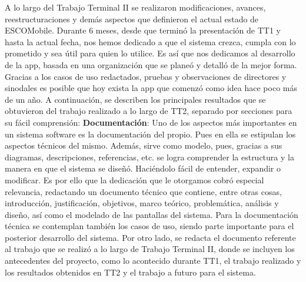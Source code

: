 \noindent
A lo largo del Trabajo Terminal II se realizaron modificaciones, avances, reestructuraciones y demás aspectos que definieron el actual estado de ESCOMobile. Durante 6 meses, desde que terminó la presentación de TT1 y hasta la actual fecha, nos hemos dedicado a que el sistema crezca, cumpla con lo prometido y sea útil para quien lo utilice. Es así que nos dedicamos al desarrollo de la app, basada en una organización que se planeó y detalló de la mejor forma. Gracias a los casos de uso redactados, pruebas y observaciones de directores y sinodales es posible que hoy exista la app que comenzó como idea hace poco más de un año. 
\newline
A continuación, se describen los principales resultados que se obtuvieron del trabajo realizado a lo largo de TT2, separado por secciones para su fácil comprensión:
\newline
\newline
\textbf{Documentación}: Uno de los aspectos más importantes en un sistema software es la documentación del propio. Pues en ella se estipulan los aspectos técnicos del mismo. Además, sirve como modelo, pues, gracias a sus diagramas, descripciones, referencias, etc. se logra comprender la estructura y la manera en que el sistema se diseñó. Haciéndolo fácil de entender, expandir o modificar. Es por ello que la dedicación que le otorgamos cobró especial relevancia, redactando un documento técnico que contiene, entre otras cosas, introducción, justificación, objetivos, marco teórico, problemática, análisis y diseño, así como el modelado de las pantallas del sistema. Para la documentación técnica se contemplan también los casos de uso, siendo parte importante para el posterior desarrollo del sistema. Por otro lado, se redacta el documento referente al trabajo que se realizó a lo largo de Trabajo Terminal II, donde se incluyen los antecedentes del proyecto, como lo acontecido durante TT1, el trabajo realizado y los resultados obtenidos en TT2 y el trabajo a futuro para el sistema.
\newline
\newline
